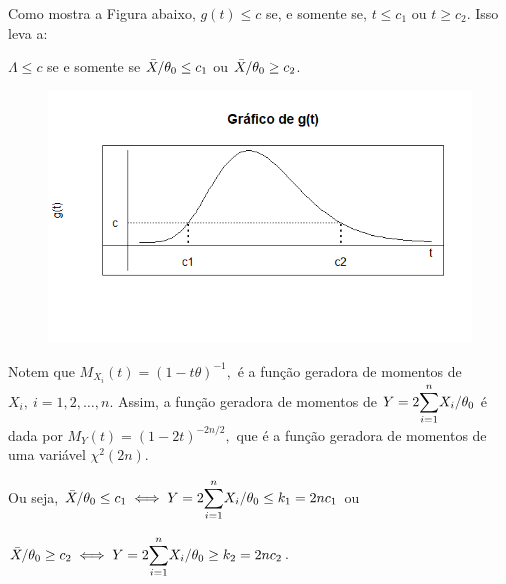 \documentclass[12pt]{beamer}
\begin{document}
\begin{frame}{}
\begin{block}{}
\justifying
Como mostra a Figura abaixo, $g(t) \leq c$ se, e somente se, $t \leq c_1$ ou $t \geq c_2$. Isso leva a:

$\Lambda \leq c$ se e somente se $\Bar{X}/\theta_0 \leq c_1$ ou $\Bar{X}/\theta_0 \geq c_2$.
\end{block}
\begin{block}{}
\begin{figure}
    \centering
    \includegraphics[scale=0.6]{figs/TRVGt.png}
    \label{fig:enter-label}
\end{figure}

\end{block}
\end{frame}

\begin{frame}{}
\begin{block}{}
\justifying
Notem que $M_{X_{i}}(t)=(1-t\theta)^{-1},$ é a função geradora de momentos de $X_{i},~i=1,2,\ldots,n.$ Assim, a função geradora de momentos de $Y=2{\displaystyle \sum_{i=1}^{n}} X_{i}/\theta_0$ é dada por $M_{Y}(t)=(1-2t)^{-2n/2},$ que é a função geradora de momentos de uma variável $\chi^{2}(2n).$
\end{block}
\pause
\begin{block}{}
\justifying
Ou seja, $\Bar{X}/\theta_0 \leq c_1\iff Y=2{\displaystyle \sum_{i=1}^{n}} X_{i}/\theta_0\leq k_{1}=2nc_{1}$ ou 
\end{block}
\pause
\begin{block}{}
\justifying
$\Bar{X}/\theta_0 \geq c_2\iff Y=2{\displaystyle \sum_{i=1}^{n}} X_{i}/\theta_0\geq k_{2}=2nc_{2}$.
\end{block}
\end{frame}
\end{document}

